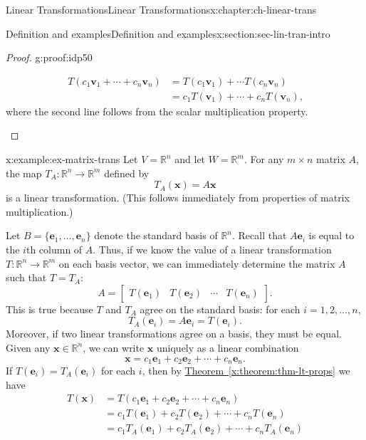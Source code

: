 \documentclass[oneside,10pt,]{book}
\newcommand{\xreffont}{\relax}
\numberwithin{equation}{section}
\newcommand{\bbm}{\begin{bmatrix}}
\newcommand{\ebm}{\end{bmatrix}}
\newcommand{\R}{\mathbb{R}}
\newcommand{\vv}{\mathbf{v}}
\newcommand{\xx}{\mathbf{x}}
\newcommand{\amp}{&}
\begin{document}
\begin{chapterptx}{Linear Transformations}{}{Linear Transformations}{}{}{x:chapter:ch-linear-trans}
\begin{sectionptx}{Definition and examples}{}{Definition and examples}{}{}{x:section:sec-lin-tran-intro}
\begin{proof}{}{g:proof:idp50}
\begin{enumerate}
\begin{align*}
T(c_1\vv_1+\cdots + c_n\vv_n) \amp = T(c_1\vv_1)+ \cdots T(c_n\vv_n)\\
\amp = c_1T(\vv_1)+\cdots +c_nT(\vv_n)\text{,}
\end{align*}
where the second line follows from the scalar multiplication property.%
\end{enumerate}
%
\end{proof}
\begin{example}{}{x:example:ex-matrix-trans}%
Let \(V=\R^n\) and let \(W=\R^m\). For any \(m\times n\) matrix \(A\), the map \(T_A:\R^n\to \R^m\) defined by%
\begin{equation*}
T_A(\xx) = A\xx
\end{equation*}
is a linear transformation. (This follows immediately from properties of matrix multiplication.)%
\par
Let \(B = \{\mathbf{e}_1,\ldots, \mathbf{e}_n\}\) denote the standard basis of \(\R^n\). Recall that \(A\mathbf{e}_i\) is equal to the \(i\)th column of \(A\). Thus, if we know the value of a linear transformation \(T:\R^n\to \R^m\) on each basis vector, we can immediately determine the matrix \(A\) such that \(T=T_A\):%
\begin{equation*}
A = \bbm T(\mathbf{e}_1) \amp T(\mathbf{e}_2) \amp \cdots \amp T(\mathbf{e}_n)\ebm\text{.}
\end{equation*}
This is true because \(T\) and \(T_A\) agree on the standard basis: for each \(i=1,2,\ldots, n\),%
\begin{equation*}
T_A(\mathbf{e}_i) = A\mathbf{e}_i = T(\mathbf{e}_i)\text{.}
\end{equation*}
Moreover, if two linear transformations agree on a basis, they must be equal. Given any \(\xx\in \R^n\), we can write \(\xx\) uniquely as a linear combination%
\begin{equation*}
\xx=c_1\mathbf{e}_1+c_2\mathbf{e}_2+\cdots + c_n\mathbf{e}_n.
\end{equation*}
If \(T(\mathbf{e}_i)=T_A(\mathbf{e}_i)\) for each \(i\), then by \hyperref[x:theorem:thm-lt-props]{Theorem~{\xreffont\ref{x:theorem:thm-lt-props}}} we have%
\begin{align*}
T(\xx) \amp = T(c_1\mathbf{e}_1+c_2\mathbf{e}_2+\cdots + c_n\mathbf{e}_n) \\
\amp = c_1T(\mathbf{e}_1)+c_2T(\mathbf{e}_2)+\cdots + c_nT(\mathbf{e}_n)\\
\amp = c_1T_A(\mathbf{e}_1)+c_2T_A(\mathbf{e}_2)+\cdots + c_nT_A(\mathbf{e}_n)\\

\end{align*}
\end{example}
\end{sectionptx}
\end{chapterptx}
\end{document}
